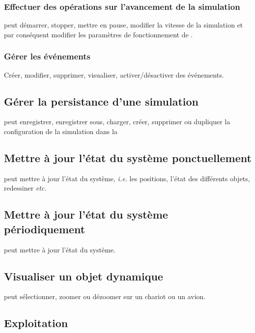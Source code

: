 \subsubsection{Effectuer des opérations sur l'avancement de la simulation}
 peut démarrer, stopper, mettre en pause, modifier la vitesse de la simulation et par conséquent modifier les paramètres de fonctionnement de .

\subsubsection{Gérer les événements}
Créer, modifier, supprimer, visualiser, activer/désactiver des événements.

\subsection{Gérer la persistance d'une simulation}
 peut enregistrer, enregistrer sous, charger, créer, supprimer ou dupliquer la configuration de la simulation dans la 

\subsection{Mettre à jour l'état du système ponctuellement}
 peut mettre à jour l'état du système, \textsl{i.e.} les positions, l'état des différents objets, redessiner \textsl{etc.}

\subsection{Mettre à jour l'état du système périodiquement}
 peut mettre à jour l'état du système.

\subsection{Visualiser un objet dynamique}
 peut sélectionner, zoomer ou dézoomer sur un chariot ou un avion.
\subsection{Exploitation}

